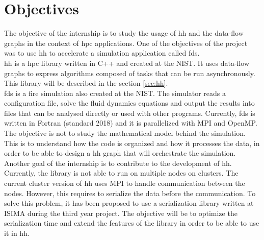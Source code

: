 
\clearpage
\section{Objectives}

The objective of the internship is to study the usage of \gls{hh} and the
data-flow graphs in the context of \gls{hpc} applications. One of the objectives
of the project was to use \gls{hh} to accelerate a simulation application called
\gls{fds}.\\

\gls{hh} is a \gls{hpc} library written in C++ and created at the NIST. It uses
data-flow graphs to express algorithms composed of tasks that can be run
asynchronously. This library will be described in the section \ref{sec:hh}.\\

\gls{fds} is a fire simulation also created at the NIST. The simulator reads a
configuration file, solve the fluid dynamics equations and output the results
into files that can be analysed directly or used with other programs. Currently,
\gls{fds} is written in Fortran (standard 2018) and it is parallelized with MPI
and OpenMP. The objective is not to study the mathematical model behind the
simulation. This is to understand how the code is organized and how it processes
the data, in order to be able to design a \gls{hh} graph that will orchestrate
the simulation.\\

Another goal of the internship is to contribute to the development of \gls{hh}.
Currently, the library is not able to run on multiple nodes on clusters. The
current cluster version of \gls{hh} uses MPI to handle communication between the
nodes. However, this requires to serialize the data before the communication. To
solve this problem, it has been proposed to use a serialization library written
at ISIMA during the third year project. The objective will be to optimize the
serialization time and extend the features of the library in order to be able to
use it in \gls{hh}.
